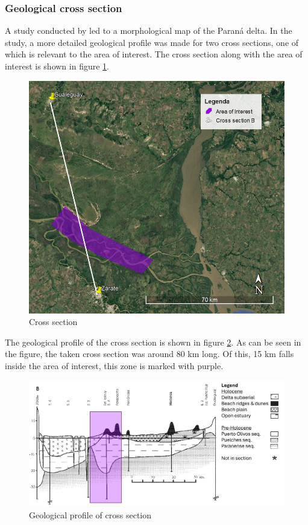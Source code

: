 \subsubsection{Geological cross section}
A study conducted by \citeauthor{joseluiscavallottoEvolucionCambiosAmbientales2005} led to a morphological map of the Paraná delta. In the study, a more detailed geological profile was made for two cross sections, one of which is relevant to the area of interest. The cross section along with the area of interest is shown in figure \ref{fig:crosssectiongeo}.

\begin{figure}[H]
    \centering
    \includegraphics[width=0.75\linewidth]{figures/ch9/CrossSectionB.png}
    \caption{Cross section}
    \label{fig:crosssectiongeo}
\end{figure}

The geological profile of the cross section is shown in figure \ref{fig:geolprofile}. As can be seen in the figure, the taken cross section was around 80 km long. Of this, 15 km falls inside the area of interest, this zone is marked with purple.

\begin{figure}[H]
    \centering
    \includegraphics[width=1\linewidth]{figures/ch9/CrossSectionBResults.png}
    \caption{Geological profile of cross section \autocite{joseluiscavallottoEvolucionCambiosAmbientales2005}}
    \label{fig:geolprofile}
\end{figure}

